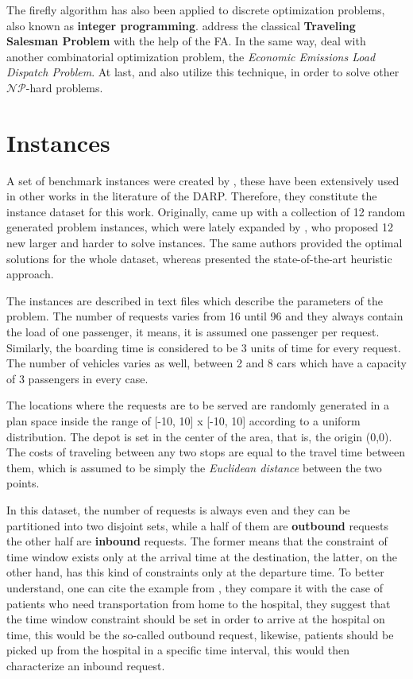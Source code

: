 \documentclass[tuberlin,cic,tc,openright,english,noabntcite,oneside]{iiufrgs}
\begin{document}
The firefly algorithm has also been applied to discrete optimization problems, also known as \textbf{integer programming}. \textcite{jati_evolutionary_2011} address the classical \textbf{Traveling Salesman Problem} with the help of the FA. In the same way, \textcite{apostolopoulos_application_2010} deal with another combinatorial optimization problem, the \emph{Economic Emissions Load Dispatch Problem}. At last, \textcite{sayadi_discrete_2010} and \textcite{sayadi_firefly-inspired_2013} also utilize this technique, in order to solve other $\mathcal{NP}$-hard problems.

\section{Instances}
A set of benchmark instances were created by \textcite{cordeau_branch-and-cut_2006}, these have been extensively used in other works in the literature of the DARP. Therefore, they constitute the instance dataset for this work. Originally, \textcite{cordeau_branch-and-cut_2006} came up with a collection of 12 random generated problem instances, which were lately expanded by \textcite{ropke_models_2007}, who proposed 12 new larger and harder to solve instances. The same authors provided the optimal solutions for the whole dataset, whereas \textcite{parragh_hybrid_2013} presented the state-of-the-art heuristic approach.

The instances are described in text files which describe the parameters of the problem. The number of requests varies from 16 until 96 and they always contain the load of one passenger, it means, it is assumed one passenger per request. Similarly, the boarding time is considered to be 3 units of time for every request. The number of vehicles varies as well, between 2 and 8 cars which have a capacity of 3 passengers in every case.

The locations where the requests are to be served are randomly generated in a plan space inside the range of [-10, 10] x [-10, 10] according to a uniform distribution. The depot is set in the center of the area, that is, the origin (0,0). The costs of traveling between any two stops are equal to the travel time between them, which is assumed to be simply the \emph{Euclidean distance} between the two points.

In this dataset, the number of requests is always even and they can be partitioned into two disjoint sets, while a half of them are \textbf{outbound} requests the other half are \textbf{inbound} requests. The former means that the constraint of time window exists only at the arrival time at the destination, the latter, on the other hand, has this kind of constraints only at the departure time. To better understand, one can cite the example from \textcite[p. 29]{cordeau_dial--ride_2007}, they compare it with the case of patients who need transportation from home to the hospital, they suggest that the time window constraint should be set in order to arrive at the hospital on time, this would be the so-called outbound request, likewise, patients should be picked up from the hospital in a specific time interval, this would then characterize an inbound request.
\end{document}
